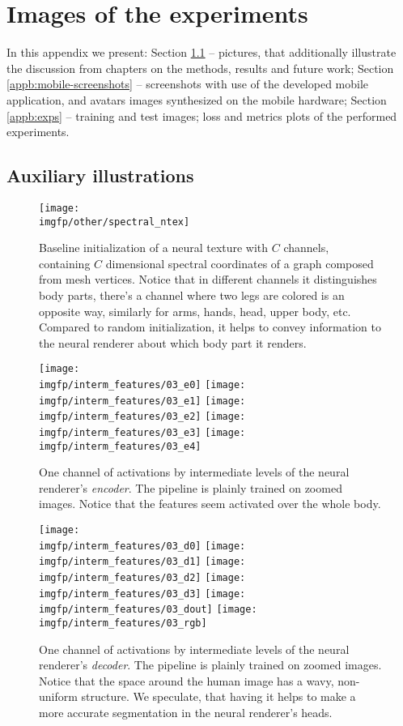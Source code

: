 \chapter{Images of the experiments}
In this appendix we present: Section \ref{appb:fig} -- pictures, that additionally illustrate the discussion from chapters on the methods, results and future work; Section \ref{appb:mobile-screenshots} -- screenshots with use of the developed mobile application, and avatars images synthesized on the mobile hardware; Section \ref{appb:exps} -- training and test images; loss and metrics plots of the performed experiments.


\section{Auxiliary illustrations}
\label{appb:fig}
\begin{figure}[!h]
	\centering
	\texttt{[image: \\imgfp/other/spectral\_ntex]}
	\caption{Baseline initialization of a neural texture with $C$ channels, containing $C$ dimensional spectral coordinates of a graph composed from mesh vertices. Notice that in different channels it distinguishes body parts, there's a channel where two legs are colored is an opposite way, similarly for arms, hands, head, upper body, etc. Compared to random initialization, it helps to convey information to the neural renderer about which body part it renders.}
	\label{fig:spectral_ntex}
\end{figure}
\begin{figure}
	\centering
	\texttt{[image: \\imgfp/interm\_features/03\_e0]}%
	\hfill\texttt{[image: \\imgfp/interm\_features/03\_e1]}%
	\hfill\texttt{[image: \\imgfp/interm\_features/03\_e2]}%
	\hfill\texttt{[image: \\imgfp/interm\_features/03\_e3]}%
	\hfill\texttt{[image: \\imgfp/interm\_features/03\_e4]}%
	\caption{One channel of activations by intermediate levels of the neural renderer's \textit{encoder}. The pipeline is plainly trained on zoomed images. Notice that the features seem activated over the whole body.}
	\label{fig:interm03_encoder}
\end{figure}
\begin{figure}
	\centering
	\texttt{[image: \\imgfp/interm\_features/03\_d0]}%
	\hfill\texttt{[image: \\imgfp/interm\_features/03\_d1]}%
	\hfill\texttt{[image: \\imgfp/interm\_features/03\_d2]}%
	\hfill\texttt{[image: \\imgfp/interm\_features/03\_d3]}%
	\hfill\texttt{[image: \\imgfp/interm\_features/03\_dout]}%
	\hfill\texttt{[image: \\imgfp/interm\_features/03\_rgb]}
	\caption{One channel of activations by intermediate levels of the neural renderer's \textit{decoder}. The pipeline is plainly trained on zoomed images. Notice that the space around the human image has a wavy, non-uniform structure. We speculate, that having it helps to make a more accurate segmentation in the neural renderer's heads. }
	\label{fig:interm03_decoder}
\end{figure}
